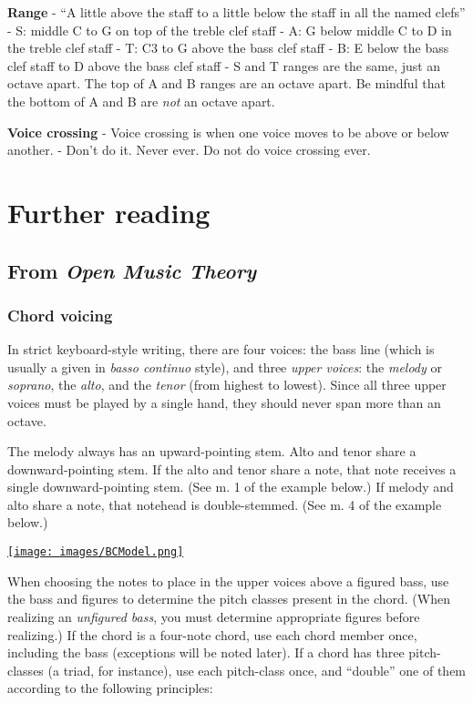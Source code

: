 \documentclass{book}
\begin{document}
\textbf{Range} - ``A little above the staff to a little below the staff in all
the named clefs'' - S: middle C to G on top of the treble clef staff - A: G
below middle C to D in the treble clef staff - T: C3 to G above the bass clef
staff - B: E below the bass clef staff to D above the bass clef staff - S and
T ranges are the same, just an octave apart. The top of A and B ranges are an
octave apart. Be mindful that the bottom of A and B are \emph{not} an octave
apart.

\textbf{Voice crossing} - Voice crossing is when one voice moves to be above
or below another. - Don't do it. Never ever. Do not do voice crossing ever.

\hypertarget{further-reading-12}{%
\chapter{Further reading}\label{further-reading-12}}

\hypertarget{from-open-music-theory-12}{%
\section{\texorpdfstring{From \emph{Open Music
Theory}}{From Open Music Theory}}\label{from-open-music-theory-12}}

\hypertarget{chord-voicing}{%
\subsection{Chord voicing}\label{chord-voicing}}

In strict keyboard-style writing, there are four voices: the bass line (which
is usually a given in \emph{basso continuo} style), and three \emph{upper
voices}: the \emph{melody} or \emph{soprano}, the \emph{alto}, and the
\emph{tenor} (from highest to lowest). Since all three upper voices must be
played by a single hand, they should never span more than an octave.

The melody always has an upward-pointing stem. Alto and tenor share a
downward-pointing stem. If the alto and tenor share a note, that note receives
a single downward-pointing stem. (See m. 1 of the example below.) If melody
and alto share a note, that notehead is double-stemmed. (See m. 4 of the
example below.)

\href{images/BCModel.png}{\texttt{[image: images/BCModel.png]}}

When choosing the notes to place in the upper voices above a figured bass, use
the bass and figures to determine the pitch classes present in the chord.
(When realizing an \emph{unfigured bass}, you must determine appropriate
figures before realizing.) If the chord is a four-note chord, use each chord
member once, including the bass (exceptions will be noted later). If a chord
has three pitch-classes (a triad, for instance), use each pitch-class once,
and ``double'' one of them according to the following principles:
\end{document}
